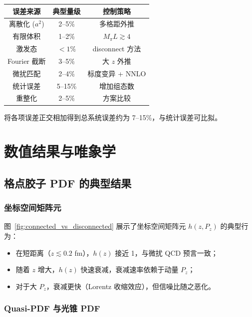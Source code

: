 \documentclass[11pt,a4paper]{ctexart}
\begin{document}
\begin{center}
\begin{tabular}{c c c}
\toprule
\textbf{误差来源} & \textbf{典型量级} & \textbf{控制策略} \\
\midrule
离散化 ($a^2$) & 2--5\% & 多格距外推 \\
有限体积 & 1--2\% & $M_\pi L \gtrsim 4$ \\
激发态 & $<1\%$ & disconnect 方法 \\
Fourier 截断 & 3--5\% & 大 $z$ 外推 \\
微扰匹配 & 2--4\% & 标度变异 + NNLO \\
统计误差 & 5--15\% & 增加组态数 \\
重整化 & 2--5\% & 方案比较 \\
\bottomrule
\end{tabular}
\end{center}

将各项误差正交相加得到总系统误差约为 7--15\%，与统计误差可比拟。

\section{数值结果与唯象学}

\subsection{格点胶子 PDF 的典型结果}

\subsubsection{坐标空间矩阵元}

图~\ref{fig:connected_vs_disconnected} 展示了坐标空间矩阵元 $h(z, P_z)$ 的典型行为：
\begin{itemize}
  \item 在短距离（$z \lesssim 0.2$ fm），$h(z)$ 接近 1，与微扰 QCD 预言一致；
  \item 随着 $z$ 增大，$h(z)$ 快速衰减，衰减速率依赖于动量 $P_z$；
  \item 对于大 $P_z$，衰减更快（Lorentz 收缩效应），但信噪比随之恶化。
\end{itemize}

\subsubsection{Quasi-PDF 与光锥 PDF}
\end{document}
